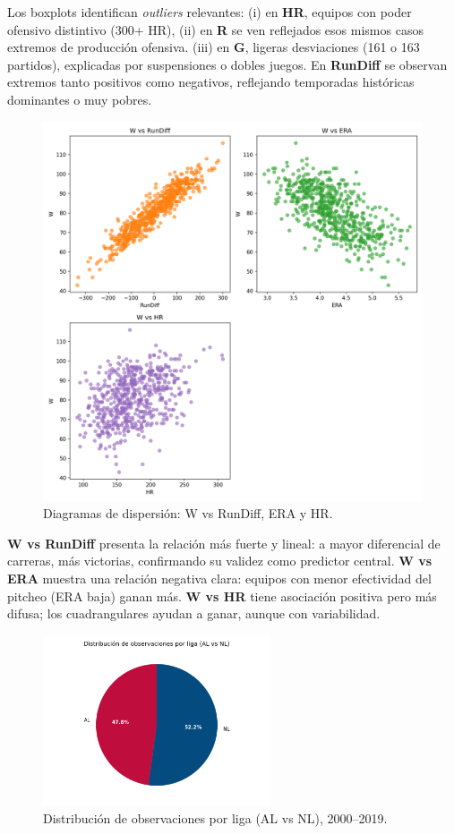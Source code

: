 \documentclass[man,floatsintext]{apa7}
\begin{document}
Los boxplots identifican \textit{outliers} relevantes: 
(i) en \textbf{HR}, equipos con poder ofensivo distintivo (300+ HR), 
(ii) en \textbf{R} se ven reflejados esos mismos casos extremos de producción ofensiva.
(iii) en \textbf{G}, ligeras desviaciones (161 o 163 partidos), explicadas por suspensiones o dobles juegos. 
En \textbf{RunDiff} se observan extremos tanto positivos como negativos, reflejando temporadas históricas dominantes o muy pobres.

\begin{figure}[H]
    \centering
    \includegraphics[width=\textwidth]{../plots/final_version/all_scatter_W.png}
    \caption{Diagramas de dispersión: W vs RunDiff, ERA y HR.}
\end{figure}

\textbf{W vs RunDiff} presenta la relación más fuerte y lineal: a mayor diferencial de carreras, más victorias, confirmando su validez como predictor central.  
\textbf{W vs ERA} muestra una relación negativa clara: equipos con menor efectividad del pitcheo (ERA baja) ganan más.  
\textbf{W vs HR} tiene asociación positiva pero más difusa; los cuadrangulares ayudan a ganar, aunque con variabilidad.


\begin{figure}[H]
    \centering
    \includegraphics[width=0.6\textwidth]{../plots/final_version/pie_ligas_colored.png}
    \caption{Distribución de observaciones por liga (AL vs NL), 2000--2019.}
\end{figure}
\end{document}
